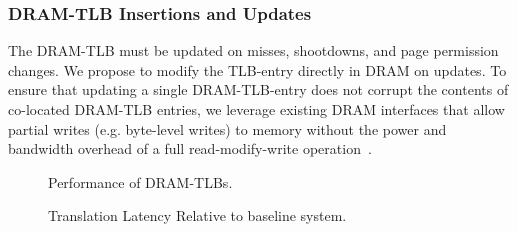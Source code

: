 
\subsubsection{DRAM-TLB Insertions and Updates}

\noindent The DRAM-TLB must be updated on misses, shootdowns, and page
permission changes. We propose to modify the TLB-entry directly in
DRAM on updates. To ensure that updating a single DRAM-TLB-entry does
not corrupt the contents of co-located DRAM-TLB entries, we leverage
existing DRAM interfaces that allow partial writes (e.g. byte-level
writes) to memory without the power and bandwidth overhead of a full
read-modify-write operation~\cite{hbm-spec}.






% 

\begin{figure}[tp] 
  \vspace{-0.in} \centering
  \centerline{}

  \caption{\small Performance of DRAM-TLBs. \normalsize}
  \label{fig:perf_stackedTLB} 
  \vspace{0.2 in}
\end{figure}

\begin{figure}[tp] 
  \vspace{0.in} \centering
  \centerline{}

  \caption{\small Translation Latency Relative to baseline system.\normalsize}
  \label{fig:tlblat_stackedTLB} 
  \vspace{0.2 in}
\end{figure}

